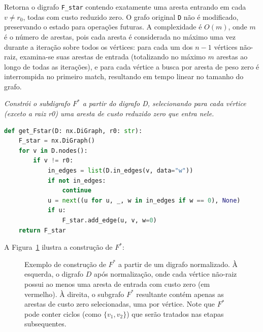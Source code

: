 Retorna o digrafo \texttt{F\_star} contendo exatamente uma aresta entrando em cada \(v\neq r_0\), todas com custo reduzido zero. O grafo original \texttt{D} não é modificado, preservando o estado para operações futuras. A complexidade é \(O(m)\), onde \(m\) é o número de arestas, pois cada aresta é considerada no máximo uma vez durante a iteração sobre todos os vértices: para cada um dos \(n-1\) vértices não-raiz, examina-se suas arestas de entrada (totalizando no máximo \(m\) arestas ao longo de todas as iterações), e para cada vértice a busca por aresta de peso zero é interrompida no primeiro match, resultando em tempo linear no tamanho do grafo.

\begin{tcolorbox}[
        enhanced, breakable,
        colframe=blue!60!black, colback=blue!2,
        colbacktitle=blue!15, coltitle=black,
        title={Construção de F star },
        boxed title style={sharp corners, boxrule=0.6pt},
        sharp corners, boxrule=0.6pt
    ]
    \emph{Constrói o subdigrafo $F^*$ a partir do digrafo D, selecionando para cada vértice (exceto a raiz r0) uma aresta de custo reduzido zero que entra nele.}
    \tcblower
    \begin{lstlisting}[mathescape=true, language=Python]
def get_Fstar(D: nx.DiGraph, r0: str):
    F_star = nx.DiGraph()
    for v in D.nodes():
        if v != r0:
            in_edges = list(D.in_edges(v, data="w"))
            if not in_edges:
                continue
            u = next((u for u, _, w in in_edges if w == 0), None)
            if u:
                F_star.add_edge(u, v, w=0)
    return F_star
\end{lstlisting}
\end{tcolorbox}

A Figura~\ref{fig:get-fstar-example} ilustra a construção de \(F^*\):

\begin{figure}[H]
    \centering
    
    \caption{Exemplo de construção de \(F^*\) a partir de um digrafo normalizado. À esquerda, o digrafo \(D\) após normalização, onde cada vértice não-raiz possui ao menos uma aresta de entrada com custo zero (em vermelho). À direita, o subgrafo \(F^*\) resultante contém apenas as arestas de custo zero selecionadas, uma por vértice. Note que \(F^*\) pode conter ciclos (como \(\{v_1, v_2\}\)) que serão tratados nas etapas subsequentes.}
    \label{fig:get-fstar-example}
\end{figure}

